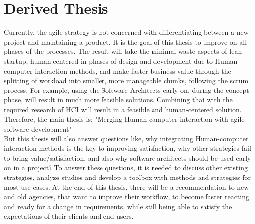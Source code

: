 \section*{Derived Thesis}

Currently, the agile strategy is not concerned with differentiating between a new project and maintaining a product. It is the goal of this thesis to improve on all phases of the processes. The result will take the minimal-waste aspects of lean-startup, human-centered in phases of design and development due to Human-computer interaction methods, and make faster business value through the splitting of workload into smaller, more manageable chunks, following the scrum process. For example, using the Software Architects early on, during the concept phase, will result in much more feasible solutions. Combining that with the required research of HCI will result in a feasible and human-centered solution. \\
Therefore, the main thesis is: "Merging Human-computer interaction with agile software development"\\
\newline
But this thesis will also answer questions like, why integrating Human-computer interaction methods is the key to improving satisfaction, why other strategies fail to bring value/satisfaction, and also why software architects should be used early on in a project? To answer these questions, it is needed to discuss other existing strategies, analyze studies and develop a toolbox with methods and strategies for most use cases. At the end of this thesis, there will be a recommendation to new and old agencies, that want to improve their workflow, to become faster reacting and ready for a change in requirements, while still being able to satisfy the expectations of their clients and end-users.